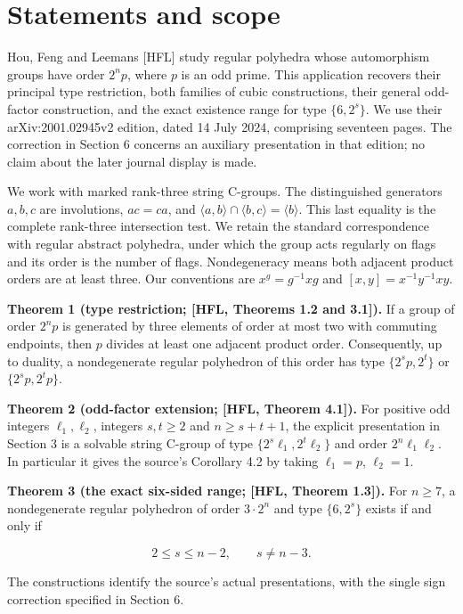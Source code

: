 \section{Statements and scope}\label{the-complete-principal-contract}

Hou, Feng and Leemans {[}HFL{]} study regular polyhedra whose automorphism
groups have order \(2^n p\), where \(p\) is an odd prime. This application
recovers their principal type restriction, both families of cubic
constructions, their general odd-factor construction, and the exact
existence range for type \(\{6,2^s\}\). We use their arXiv:2001.02945v2
edition, dated 14 July 2024, comprising seventeen pages. The correction
in Section 6 concerns an auxiliary presentation in that edition; no
claim about the later journal display is made.

We work with marked rank-three string C-groups. The distinguished
generators \(a,b,c\) are involutions, \(ac=ca\), and
\(\langle a,b\rangle\cap\langle b,c\rangle=\langle b\rangle\).
This last equality is the complete rank-three intersection test. We
retain the standard correspondence with regular abstract polyhedra,
under which the group acts regularly on flags and its order is the
number of flags. Nondegeneracy means both adjacent product orders are
at least three. Our conventions are \(x^g=g^{-1}xg\) and \([x,y]=x^{-1}y^{-1}xy\).

\textbf{Theorem 1 (type restriction; {[}HFL, Theorems 1.2 and 3.1{]}).} If a
group of order \(2^n p\) is generated by three elements of order at most two with commuting
endpoints, then \(p\) divides at least one adjacent product order.
Consequently, up to duality, a nondegenerate regular polyhedron of this
order has type \(\{2^s p,2^t\}\) or \(\{2^s p,2^t p\}\).

\textbf{Theorem 2 (odd-factor extension; {[}HFL, Theorem 4.1{]}).} For positive
odd integers \(\ell_1,\ell_2\), integers \(s,t\geq2\) and
\(n\geq s+t+1\), the explicit presentation in Section 3 is a solvable
string C-group of type \(\{2^s\ell_1,2^t\ell_2\}\) and order
\(2^n\ell_1\ell_2\). In particular it gives the source's Corollary 4.2
by taking \(\ell_1=p\), \(\ell_2=1\).

\textbf{Theorem 3 (the exact six-sided range; {[}HFL, Theorem 1.3{]}).} For
\(n\geq7\), a nondegenerate regular polyhedron of order \(3\cdot2^n\)
and type \(\{6,2^s\}\) exists if and only if

\[2\leq s\leq n-2,\qquad s\ne n-3.\tag{1}\]

The constructions identify the source's actual presentations, with the
single sign correction specified in Section 6.


